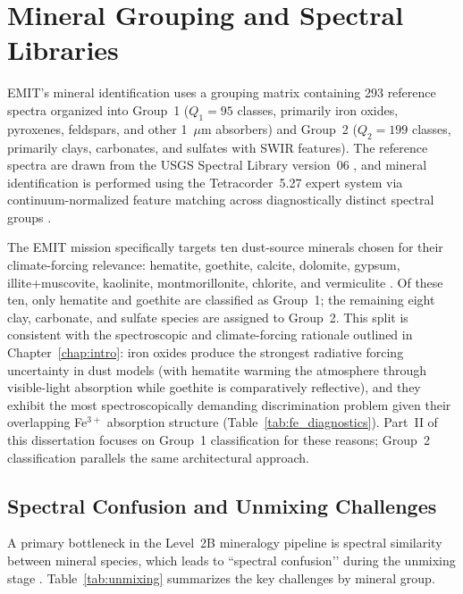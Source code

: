 \documentclass[11pt]{report}
\begin{document}
\section{Mineral Grouping and Spectral Libraries}

EMIT’s mineral identification uses a grouping matrix containing 293 reference spectra organized into Group~1 ($Q_1 = 95$ classes, primarily iron oxides, pyroxenes, feldspars, and other 1~$\mu$m absorbers) and Group~2 ($Q_2 = 199$ classes, primarily clays, carbonates, and sulfates with SWIR features). The reference spectra are drawn from the USGS Spectral Library version~06 \cite{kokaly2017usgs}, and mineral identification is performed using the Tetracorder~5.27 expert system via continuum-normalized feature matching across diagnostically distinct spectral groups \cite{emit_l2b_atbd, clark2003tetracorder}.

The EMIT mission specifically targets ten dust-source minerals chosen for their climate-forcing relevance: hematite, goethite, calcite, dolomite, gypsum, illite+muscovite, kaolinite, montmorillonite, chlorite, and vermiculite \cite{emit_factsheet, emit_l3_atbd}. Of these ten, only hematite and goethite are classified as Group~1; the remaining eight clay, carbonate, and sulfate species are assigned to Group~2. This split is consistent with the spectroscopic and climate-forcing rationale outlined in Chapter~\ref{chap:intro}: iron oxides produce the strongest radiative forcing uncertainty in dust models (with hematite warming the atmosphere through visible-light absorption while goethite is comparatively reflective), and they exhibit the most spectroscopically demanding discrimination problem given their overlapping Fe$^{3+}$ absorption structure (Table~\ref{tab:fe_diagnostics}). Part~II of this dissertation focuses on Group~1 classification for these reasons; Group~2 classification parallels the same architectural approach.

\subsection{Spectral Confusion and Unmixing Challenges}

A primary bottleneck in the Level~2B mineralogy pipeline is spectral similarity between mineral species, which leads to ``spectral confusion’’ during the unmixing stage \cite{emit_l2b_atbd, emit_l3_atbd}. Table~\ref{tab:unmixing} summarizes the key challenges by mineral group.
\end{document}
